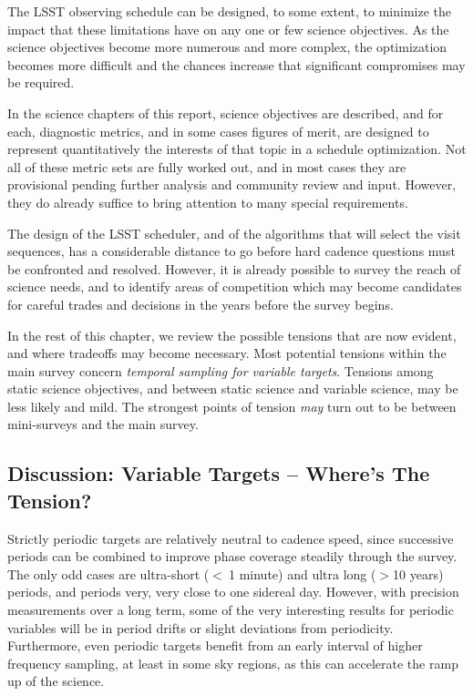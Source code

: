 The LSST observing schedule can be designed, to some extent, to minimize
the impact that these limitations have on any one or few science
objectives. As the science objectives become more numerous and more
complex, the optimization becomes more difficult and the chances
increase that significant compromises may be required.

In the science chapters of this report, science objectives are
described, and for each, diagnostic metrics, and in some cases figures
of merit, are designed to represent quantitatively the interests of that
topic in a schedule optimization.  Not all of these metric sets are
fully worked out, and in most cases they are provisional pending further
analysis and community review and input.  However, they do already
suffice to bring attention to many special requirements.

The design of the LSST scheduler, and of the algorithms that will select
the visit sequences, has a considerable distance to go before hard
cadence questions must be confronted and resolved.  However, it is
already possible to survey the reach of science needs, and to identify
areas of competition which may become candidates for careful trades and
decisions in the years before the survey begins.

In the rest of this chapter, we review the possible tensions that are
now evident, and where tradeoffs may become necessary. Most potential
tensions within the main survey concern {\it temporal sampling for
variable targets}.  Tensions among static science objectives, and
between static science and variable science, may be less likely and
mild. The strongest points of tension {\it may} turn out to be between
mini-surveys and the main survey.


\subsection{Discussion: Variable Targets -- Where's The Tension?}

Strictly periodic targets are relatively neutral to cadence speed, since
successive periods can be combined to improve phase coverage steadily
through the survey.  The only odd cases are ultra-short ($<~ $1 minute)
and ultra long ($> $10 years) periods, and periods very, very close to
one sidereal day.  However, with precision measurements over a long
term, some of the very interesting results for periodic variables will
be in period drifts or slight deviations from periodicity. Furthermore,
even periodic targets benefit from an early interval of higher frequency
sampling, at least in some sky regions, as this can accelerate the ramp
up of the science.

